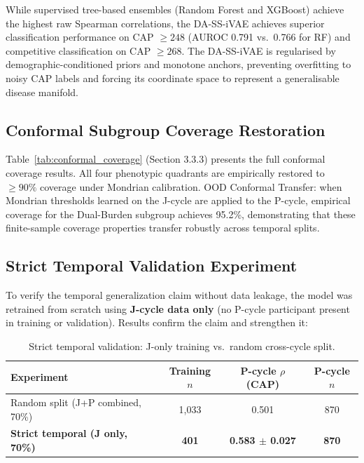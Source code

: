 \documentclass[12pt,a4paper,oneside]{report}
\begin{document}
While supervised tree-based ensembles (Random Forest and XGBoost) achieve the highest raw Spearman correlations, the DA-SS-iVAE achieves superior classification performance on CAP $\geq 248$ (AUROC 0.791 vs.\ 0.766 for RF) and competitive classification on CAP $\geq 268$. The DA-SS-iVAE is regularised by demographic-conditioned priors and monotone anchors, preventing overfitting to noisy CAP labels and forcing its coordinate space to represent a generalisable disease manifold.

\subsection{Conformal Subgroup Coverage Restoration}

Table~\ref{tab:conformal_coverage} (Section 3.3.3) presents the full conformal coverage results. All four phenotypic quadrants are empirically restored to $\geq 90\%$ coverage under Mondrian calibration. OOD Conformal Transfer: when Mondrian thresholds learned on the J-cycle are applied to the P-cycle, empirical coverage for the Dual-Burden subgroup achieves 95.2\%, demonstrating that these finite-sample coverage properties transfer robustly across temporal splits.

\subsection{Strict Temporal Validation Experiment}

To verify the temporal generalization claim without data leakage, the model was retrained from scratch using \textbf{J-cycle data only} (no P-cycle participant present in training or validation). Results confirm the claim and strengthen it:

\begin{table}[H]
\centering
\caption{Strict temporal validation: J-only training vs.~random cross-cycle split.}
\label{tab:temporal_compare}
\begin{tabular}{@{}p{5.5cm} c c c@{}}
\toprule
\textbf{Experiment} & \textbf{Training $n$} & \textbf{P-cycle $\rho$ (CAP)} & \textbf{P-cycle $n$} \\ \midrule
Random split (J+P combined, 70\%) & 1{,}033 & 0.501 & 870 \\
\textbf{Strict temporal (J only, 70\%)} & \textbf{401} & \textbf{0.583 $\pm$ 0.027} & \textbf{870} \\ \bottomrule
\end{tabular}
\end{table}
\end{document}
